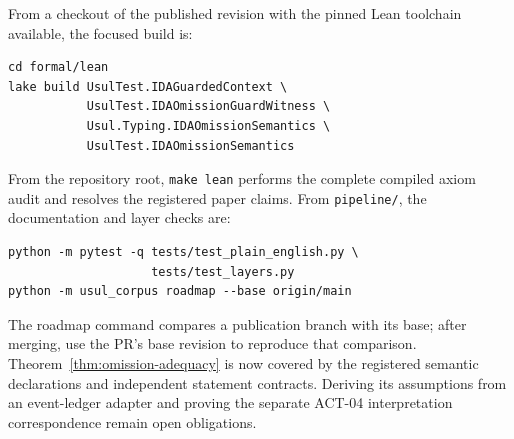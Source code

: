 \documentclass[11pt]{article}
\begin{document}
From a checkout of the published revision with the pinned Lean toolchain available, the focused build is:
\begin{verbatim}
cd formal/lean
lake build UsulTest.IDAGuardedContext \
           UsulTest.IDAOmissionGuardWitness \
           Usul.Typing.IDAOmissionSemantics \
           UsulTest.IDAOmissionSemantics
\end{verbatim}
From the repository root, \texttt{make lean} performs the complete compiled axiom audit and resolves the registered paper claims. From \texttt{pipeline/}, the documentation and layer checks are:
\begin{verbatim}
python -m pytest -q tests/test_plain_english.py \
                    tests/test_layers.py
python -m usul_corpus roadmap --base origin/main
\end{verbatim}
The roadmap command compares a publication branch with its base; after merging, use the PR's base revision to reproduce that comparison. Theorem~\ref{thm:omission-adequacy} is now covered by the registered semantic declarations and independent statement contracts. Deriving its assumptions from an event-ledger adapter and proving the separate ACT-04 interpretation correspondence remain open obligations.
\end{document}
